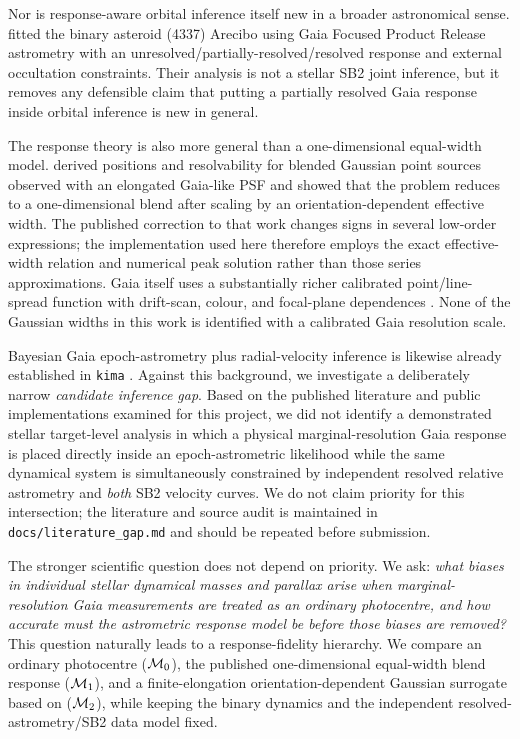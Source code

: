 Nor is response-aware orbital inference itself new in a broader astronomical sense. \citet{Liu2024} fitted the binary asteroid (4337) Arecibo using Gaia Focused Product Release astrometry with an unresolved/partially-resolved/resolved response and external occultation constraints. Their analysis is not a stellar SB2 joint inference, but it removes any defensible claim that putting a partially resolved Gaia response inside orbital inference is new in general.

The response theory is also more general than a one-dimensional equal-width model. \citet{Penoyre2026} derived positions and resolvability for blended Gaussian point sources observed with an elongated Gaia-like PSF and showed that the problem reduces to a one-dimensional blend after scaling by an orientation-dependent effective width. The published correction to that work changes signs in several low-order expressions; the implementation used here therefore employs the exact effective-width relation and numerical peak solution rather than those series approximations. Gaia itself uses a substantially richer calibrated point/line-spread function with drift-scan, colour, and focal-plane dependences \citep{Rowell2021,Rowell2026}. None of the Gaussian widths in this work is identified with a calibrated Gaia resolution scale.

Bayesian Gaia epoch-astrometry plus radial-velocity inference is likewise already established in \texttt{kima} \citep{Baycroft2026}. Against this background, we investigate a deliberately narrow \emph{candidate inference gap}. Based on the published literature and public implementations examined for this project, we did not identify a demonstrated stellar target-level analysis in which a physical marginal-resolution Gaia response is placed directly inside an epoch-astrometric likelihood while the same dynamical system is simultaneously constrained by independent resolved relative astrometry and \emph{both} SB2 velocity curves. We do not claim priority for this intersection; the literature and source audit is maintained in \texttt{docs/literature\_gap.md} and should be repeated before submission.

The stronger scientific question does not depend on priority. We ask: \emph{what biases in individual stellar dynamical masses and parallax arise when marginal-resolution Gaia measurements are treated as an ordinary photocentre, and how accurate must the astrometric response model be before those biases are removed?} This question naturally leads to a response-fidelity hierarchy. We compare an ordinary photocentre ($\mathcal{M}_0$), the published one-dimensional equal-width blend response ($\mathcal{M}_1$), and a finite-elongation orientation-dependent Gaussian surrogate based on \citet{Penoyre2026} ($\mathcal{M}_2$), while keeping the binary dynamics and the independent resolved-astrometry/SB2 data model fixed.

